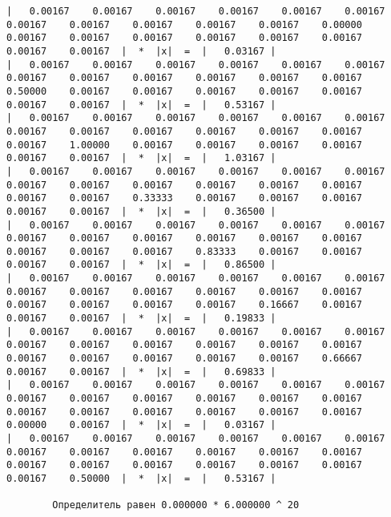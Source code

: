 \documentclass[a4paper,12pt,titlepage,finall]{article}
\begin{document}
\begin{verbatim}
|   0.00167    0.00167    0.00167    0.00167    0.00167    0.00167    0.00167    0.00167    0.00167    0.00167    0.00167    0.00000    0.00167    0.00167    0.00167    0.00167    0.00167    0.00167    0.00167    0.00167  |  *  |x|  =  |   0.03167 |
|   0.00167    0.00167    0.00167    0.00167    0.00167    0.00167    0.00167    0.00167    0.00167    0.00167    0.00167    0.00167    0.50000    0.00167    0.00167    0.00167    0.00167    0.00167    0.00167    0.00167  |  *  |x|  =  |   0.53167 |
|   0.00167    0.00167    0.00167    0.00167    0.00167    0.00167    0.00167    0.00167    0.00167    0.00167    0.00167    0.00167    0.00167    1.00000    0.00167    0.00167    0.00167    0.00167    0.00167    0.00167  |  *  |x|  =  |   1.03167 |
|   0.00167    0.00167    0.00167    0.00167    0.00167    0.00167    0.00167    0.00167    0.00167    0.00167    0.00167    0.00167    0.00167    0.00167    0.33333    0.00167    0.00167    0.00167    0.00167    0.00167  |  *  |x|  =  |   0.36500 |
|   0.00167    0.00167    0.00167    0.00167    0.00167    0.00167    0.00167    0.00167    0.00167    0.00167    0.00167    0.00167    0.00167    0.00167    0.00167    0.83333    0.00167    0.00167    0.00167    0.00167  |  *  |x|  =  |   0.86500 |
|   0.00167    0.00167    0.00167    0.00167    0.00167    0.00167    0.00167    0.00167    0.00167    0.00167    0.00167    0.00167    0.00167    0.00167    0.00167    0.00167    0.16667    0.00167    0.00167    0.00167  |  *  |x|  =  |   0.19833 |
|   0.00167    0.00167    0.00167    0.00167    0.00167    0.00167    0.00167    0.00167    0.00167    0.00167    0.00167    0.00167    0.00167    0.00167    0.00167    0.00167    0.00167    0.66667    0.00167    0.00167  |  *  |x|  =  |   0.69833 |
|   0.00167    0.00167    0.00167    0.00167    0.00167    0.00167    0.00167    0.00167    0.00167    0.00167    0.00167    0.00167    0.00167    0.00167    0.00167    0.00167    0.00167    0.00167    0.00000    0.00167  |  *  |x|  =  |   0.03167 |
|   0.00167    0.00167    0.00167    0.00167    0.00167    0.00167    0.00167    0.00167    0.00167    0.00167    0.00167    0.00167    0.00167    0.00167    0.00167    0.00167    0.00167    0.00167    0.00167    0.50000  |  *  |x|  =  |   0.53167 |

        Определитель равен 0.000000 * 6.000000 ^ 20


\end{verbatim}
\end{document}
